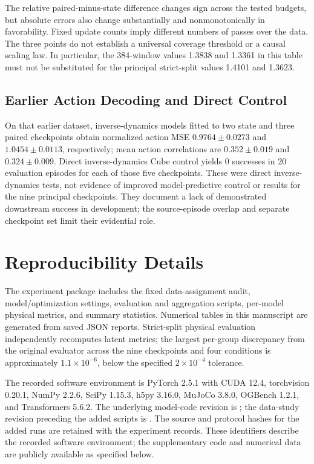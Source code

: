 The relative paired-minus-state difference changes sign across the tested budgets, but absolute errors also change substantially and nonmonotonically in favorability. Fixed update counts imply different numbers of passes over the data. The three points do not establish a universal coverage threshold or a causal scaling law. In particular, the 384-window values 1.3838 and 1.3361 in this table must not be substituted for the principal strict-split values 1.4101 and 1.3623.


\subsection{Earlier Action Decoding and Direct Control}
On that earlier dataset, inverse-dynamics models fitted to two state and three paired checkpoints obtain normalized action MSE $0.9764\pm0.0273$ and $1.0454\pm0.0113$, respectively; mean action correlations are $0.352\pm0.019$ and $0.324\pm0.009$. Direct inverse-dynamics Cube control yields 0 successes in 20 evaluation episodes for each of those five checkpoints. These were direct inverse-dynamics tests, not evidence of improved model-predictive control or results for the nine principal checkpoints. They document a lack of demonstrated downstream success in development; the source-episode overlap and separate checkpoint set limit their evidential role.

\section{Reproducibility Details}
\label{app:repro}
The experiment package includes the fixed data-assignment audit, model/optimization settings, evaluation and aggregation scripts, per-model physical metrics, and summary statistics. Numerical tables in this manuscript are generated from saved JSON reports. Strict-split physical evaluation independently recomputes latent metrics; the largest per-group discrepancy from the original evaluator across the nine checkpoints and four conditions is approximately $1.1\times10^{-6}$, below the specified $2\times10^{-4}$ tolerance.

The recorded software environment is PyTorch 2.5.1 with CUDA 12.4, torchvision 0.20.1, NumPy 2.2.6, SciPy 1.15.3, h5py 3.16.0, MuJoCo 3.8.0, OGBench 1.2.1, and Transformers 5.6.2. The underlying model-code revision is ; the data-study revision preceding the added scripts is . The source and protocol hashes for the added runs are retained with the experiment records. These identifiers describe the recorded software environment; the supplementary code and numerical data are publicly available as specified below.

